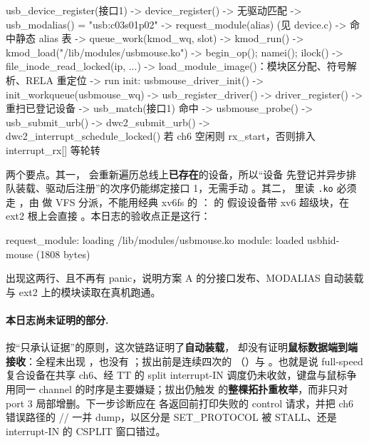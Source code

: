 \begin{txtcode}
usb_device_register(接口1)  ->  device_register()  ->  无驱动匹配
  ->  usb_modalias() = "usb:c03s01p02"
  ->  request_module(alias)                     (见 device.c)
       ->  命中静态 alias 表 ->  queue_work(kmod_wq, slot)
            ->  kmod_run() ->  kmod_load("/lib/modules/usbmouse.ko")
                 ->  begin_op(); namei(); ilock()
                 ->  file_inode_read_locked(ip, ...)          %
                 ->  load_module_image()：模块区分配、符号解析、RELA 重定位
                 ->  run init: usbmouse_driver_init()
                      ->  init_workqueue(usbmouse_wq)        %
                      ->  usb_register_driver() -> driver_register()
                           ->  重扫已登记设备 -> usb_match(接口1) 命中
                           ->  usbmouse_probe() -> usb_submit_urb()
                                ->  dwc2_submit_urb() -> dwc2_interrupt_schedule_locked()
                                     若 ch6 空闲则 rx_start，否则排入 interrupt_rx[] 等轮转
\end{txtcode}

两个要点。其一， 会重新遍历总线上\textbf{已存在}的设备，所以“设备
先登记并异步排队装载、驱动后注册”的次序仍能绑定接口 1，无需手动 。其二，
 里读 \texttt{.ko} 必须走 ，由
 做 VFS 分派，不能用经典
xv6fs 的 ： 的  假设设备带 xv6 超级块，在
ext2 根上会直接 。本日志的验收点正是这行：

\begin{txtcode}
request_module: loading /lib/modules/usbmouse.ko
module: loaded usbhid-mouse (1808 bytes)
\end{txtcode}

出现这两行、且不再有  panic，说明方案 A 的分接口发布、MODALIAS 自动装载
与 ext2 上的模块读取在真机跑通。

\paragraph{本日志尚未证明的部分.} 按“只承认证据”的原则，这次链路证明了\textbf{自动装载}，
却没有证明\textbf{鼠标数据端到端接收}：全程未出现 ，也没有 ；拔出前是连续四次的
（）与 。也就是说 full-speed 复合设备在共享 ch6、经 TT 的 split interrupt-IN
调度仍未收敛，键盘与鼠标争用同一 channel 的时序是主要嫌疑；拔出仍触发
 的\textbf{整棵拓扑重枚举}，而非只对 port 3 局部增删。下一步诊断应在
 各返回前打印失败的 control 请求，并把 ch6 错误路径的
// 一并 dump，以区分是 SET\_PROTOCOL 被 STALL、还是
interrupt-IN 的 CSPLIT 窗口错过。

